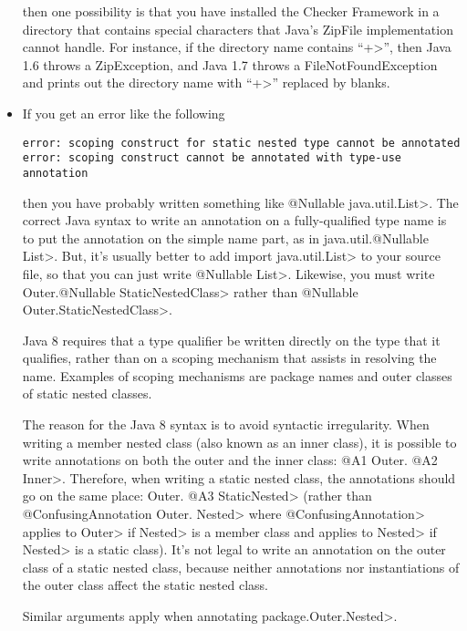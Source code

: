 \begin{itemize}
\noindent
then one possibility is that you have installed the Checker Framework in a
directory that contains special characters that Java's ZipFile
implementation cannot handle.  For instance, if the directory name contains
``\<+>'', then Java 1.6 throws a ZipException, and Java 1.7 throws a
FileNotFoundException and prints out the directory name with ``\<+>''
replaced by blanks.

\item
If you get an error like the following

\begin{Verbatim}
error: scoping construct for static nested type cannot be annotated
error: scoping construct cannot be annotated with type-use annotation
\end{Verbatim}

\noindent
\begin{sloppypar}
then you have probably written something like \<@Nullable java.util.List>.
The correct Java syntax to write an annotation on a fully-qualified type
name is to put the annotation on the simple name part, as in
\<java.util.@Nullable List>.  But, it's usually
better to add \<import java.util.List> to your source file, so that you can
just write \<@Nullable List>.  Likewise, you must write \<Outer.@Nullable
StaticNestedClass> rather than \<@Nullable Outer.StaticNestedClass>.
\end{sloppypar}

Java 8 requires that a type qualifier be written directly on the type that
it qualifies, rather than on a scoping mechanism that assists in resolving
the name.  Examples of scoping mechanisms are package names and outer
classes of static nested classes.

The reason for the Java 8 syntax is to avoid syntactic irregularity.  When
writing a member nested class (also known as an inner class), it is
possible to write annotations on both the outer and the inner class:  \<@A1
Outer. @A2 Inner>.  Therefore, when writing a static nested class, the
annotations should go on the same place:  \<Outer. @A3 StaticNested> (rather
than \<@ConfusingAnnotation Outer. Nested> where
\<@ConfusingAnnotation> applies to \<Outer> if \<Nested> is a member class
and applies to \<Nested> if \<Nested> is a static class).  It's not legal
to write an annotation on the outer class of a static nested class, because
neither annotations nor instantiations of the outer class affect the static
nested class.

Similar arguments apply when annotating \<package.Outer.Nested>.


\end{itemize}
